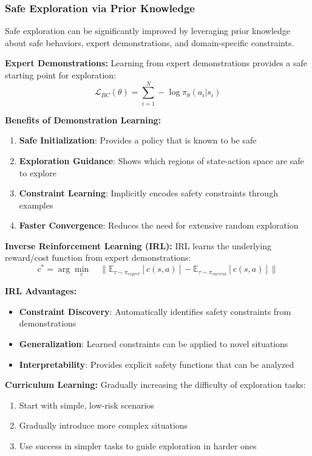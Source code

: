 \documentclass[12pt]{article}
\begin{document}
{{{{\subsubsection{Safe Exploration via Prior Knowledge}

Safe exploration can be significantly improved by leveraging prior knowledge about safe behaviors, expert demonstrations, and domain-specific constraints.

\textbf{Expert Demonstrations:}
Learning from expert demonstrations provides a safe starting point for exploration:
\begin{equation}
\mathcal{L}_{BC}(\theta) = \sum_{i=1}^{N} -\log \pi_\theta(a_i|s_i)
\end{equation}

\textbf{Benefits of Demonstration Learning:}
\begin{enumerate}
\item \textbf{Safe Initialization}: Provides a policy that is known to be safe
\item \textbf{Exploration Guidance}: Shows which regions of state-action space are safe to explore
\item \textbf{Constraint Learning}: Implicitly encodes safety constraints through examples
\item \textbf{Faster Convergence}: Reduces the need for extensive random exploration
\end{enumerate}

\textbf{Inverse Reinforcement Learning (IRL):}
IRL learns the underlying reward/cost function from expert demonstrations:
\begin{equation}
c^* = \arg\min_c \quad \|\mathbb{E}_{\tau \sim \pi_{expert}}[c(s,a)] - \mathbb{E}_{\tau \sim \pi_{current}}[c(s,a)]\|
\end{equation}

\textbf{IRL Advantages:}
\begin{itemize}
\item \textbf{Constraint Discovery}: Automatically identifies safety constraints from demonstrations
\item \textbf{Generalization}: Learned constraints can be applied to novel situations
\item \textbf{Interpretability}: Provides explicit safety functions that can be analyzed
\end{itemize}

\textbf{Curriculum Learning:}
Gradually increasing the difficulty of exploration tasks:
\begin{enumerate}
\item Start with simple, low-risk scenarios
\item Gradually introduce more complex situations
\item Use success in simpler tasks to guide exploration in harder ones
\end{enumerate}

}}}}
\end{document}
